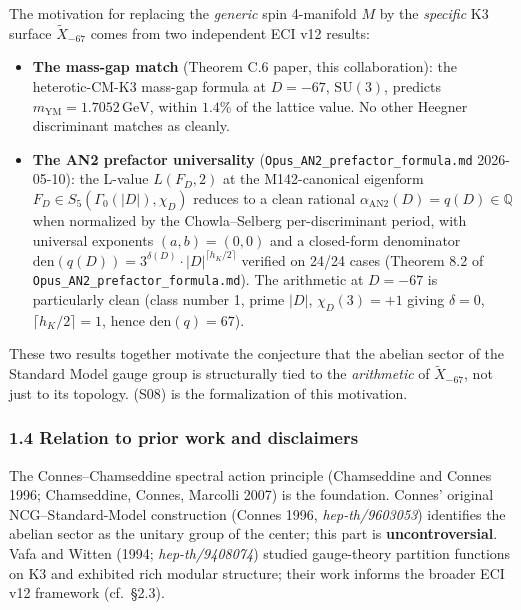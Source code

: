 \documentclass[
  11pt,
  a4paper,
]{article}
\begin{document}
The motivation for replacing the \emph{generic} spin 4-manifold \(M\) by the \emph{specific} K3 surface \(\tilde X_{-67}\) comes from two independent ECI v12 results:

\begin{itemize}
\item
  \textbf{The mass-gap match} (Theorem C.6 paper, this collaboration): the heterotic-CM-K3 mass-gap formula at \(D = -67\), \(\mathrm{SU}(3)\), predicts \(m_{\mathrm{YM}} = 1.7052\,\mathrm{GeV}\), within \(1.4\%\) of the lattice value. No other Heegner discriminant matches as cleanly.
\item
  \textbf{The AN2 prefactor universality} (\texttt{Opus\_AN2\_prefactor\_formula.md} 2026-05-10): the L-value \(L(F_D, 2)\) at the M142-canonical eigenform \(F_D \in S_5(\Gamma_0(|D|), \chi_D)\) reduces to a clean rational \(\alpha_{\mathrm{AN2}}(D) = q(D) \in \mathbb Q\) when normalized by the Chowla--Selberg per-discriminant period, with universal exponents \((a, b) = (0, 0)\) and a closed-form denominator \(\mathrm{den}(q(D)) = 3^{\delta(D)}\cdot |D|^{\lceil h_K/2\rceil}\) verified on 24/24 cases (Theorem 8.2 of \texttt{Opus\_AN2\_prefactor\_formula.md}). The arithmetic at \(D = -67\) is particularly clean (class number 1, prime \(|D|\), \(\chi_D(3) = +1\) giving \(\delta = 0\), \(\lceil h_K/2 \rceil = 1\), hence \(\mathrm{den}(q) = 67\)).
\end{itemize}

These two results together motivate the conjecture that the abelian sector of the Standard Model gauge group is structurally tied to the \emph{arithmetic} of \(\tilde X_{-67}\), not just to its topology. (S08) is the formalization of this motivation.

\hypertarget{relation-to-prior-work-and-disclaimers}{%
\subsubsection{1.4 Relation to prior work and disclaimers}\label{relation-to-prior-work-and-disclaimers}}

The Connes--Chamseddine spectral action principle (Chamseddine and Connes 1996; Chamseddine, Connes, Marcolli 2007) is the foundation. Connes' original NCG--Standard-Model construction (Connes 1996, \emph{hep-th/9603053}) identifies the abelian sector as the unitary group of the center; this part is \textbf{uncontroversial}. Vafa and Witten (1994; \emph{hep-th/9408074}) studied gauge-theory partition functions on K3 and exhibited rich modular structure; their work informs the broader ECI v12 framework (cf.~§2.3).
\end{document}
